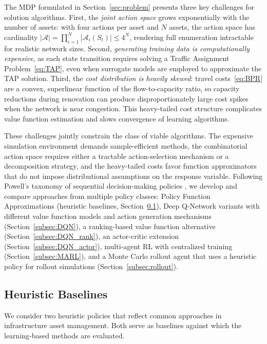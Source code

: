 \documentclass[3p, twocolumn]{elsarticle}
\begin{document}
The MDP formulated in Section~\ref{sec:problem} presents three key challenges for solution algorithms. First, the \emph{joint action space} grows exponentially with the number of assets: with four actions per asset and $N$ assets, the action space has cardinality $|\mathcal{A}| = \prod_{i=1}^{N} |\mathcal{A}_i(S_t)| \leq 4^N$, rendering full enumeration intractable for realistic network sizes. Second, \emph{generating training data is computationally expensive}, as each state transition requires solving a Traffic Assignment Problem~\eqref{eq:TAP}, even when surrogate models are employed to approximate the TAP solution. Third, the \emph{cost distribution is heavily skewed}: travel costs~\eqref{eq:BPR} are a convex, superlinear function of the flow-to-capacity ratio, so capacity reductions during renovation can produce disproportionately large cost spikes when the network is near congestion. This heavy-tailed cost structure complicates value function estimation and slows convergence of learning algorithms.

These challenges jointly constrain the class of viable algorithms. The expensive simulation environment demands sample-efficient methods, the combinatorial action space requires either a tractable action-selection mechanism or a decomposition strategy, and the heavy-tailed costs favor function approximators that do not impose distributional assumptions on the response variable. Following Powell's taxonomy of sequential decision-making policies \citep{noauthor_optimizing_2011}, we develop and compare approaches from multiple policy classes: Policy Function Approximations (heuristic baselines, Section~\ref{subsec:heuristics}), Deep Q-Network variants with different value function models and action generation mechanisms (Section~\ref{subsec:DQN}), a ranking-based value function alternative (Section~\ref{subsec:DQN_rank}), an actor-critic extension (Section~\ref{subsec:DQN_actor}), multi-agent RL with centralized training (Section~\ref{subsec:MARL}), and a Monte Carlo rollout agent that uses a heuristic policy for rollout simulations (Section~\ref{subsec:rollout}).

\subsection{Heuristic Baselines}
\label{subsec:heuristics}

We consider two heuristic policies that reflect common approaches in infrastructure asset management. Both serve as baselines against which the learning-based methods are evaluated.
\end{document}
